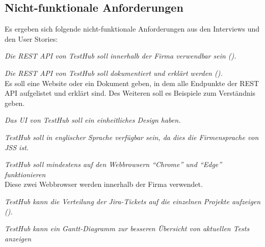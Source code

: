 \subsection{Nicht-funktionale Anforderungen}\label{sec:nfas}
Es ergeben sich folgende nicht-funktionale Anforderungen aus den Interviews und 
den User Stories:

\begin{description}

    \textit{Die REST API von TestHub soll innerhalb der Firma verwendbar sein ().}

    \textit{Die REST API von TestHub soll dokumentiert und erklärt werden ().}\\
    Es soll eine Website oder ein Dokument geben, in dem alle Endpunkte der REST API
    aufgelistet und erklärt sind. Des Weiteren soll es Beispiele zum 
    Verständnis geben.

    \textit{Das \gls{UI} von TestHub soll ein einheitliches Design haben.}

    \textit{TestHub soll in englischer Sprache verfügbar sein, da dies die 
    Firmensprache von \gls{JSS} ist.}

    \textit{TestHub soll mindestens auf den Webbrowsern ``Chrome'' und ``Edge'' funktionieren}\\
    Diese zwei Webbrowser werden innerhalb der Firma verwendet.


    \textit{TestHub kann die Verteilung der Jira-Tickets auf die einzelnen Projekte 
    aufzeigen ().}

    \textit{TestHub kann ein Gantt-Diagramm zur besseren Übersicht von aktuellen Tests anzeigen}
    
\end{description}

\newpage